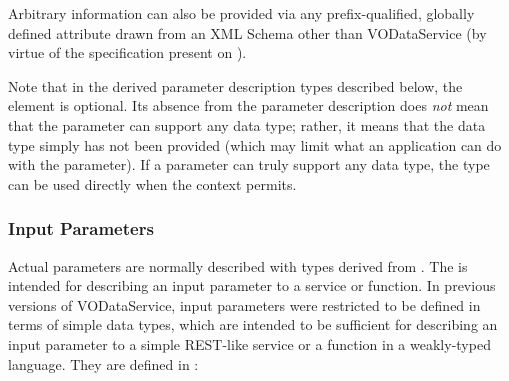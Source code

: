 \documentclass[11pt,a4paper]{ivoa}
\begin{document}
Arbitrary information can also be
provided via any prefix-qualified, globally defined attribute drawn
from an XML Schema other than VODataService (by virtue of the
 specification present
on ).





Note that in the derived parameter description types described below,
the  element is optional.  Its absence
from the parameter description does \emph{not} mean that the
parameter can support any data type; rather, it means that the data
type simply has not been provided (which may limit what an application
can do with the parameter).  If a parameter can truly support any data
type, the  type can be used directly when the
context permits.


\subsubsection{Input Parameters}
\label{sect:inputparam}


Actual parameters are normally described with types derived from
.  The  is intended
for describing an input parameter to a service or function.  In previous
versions of VODataService, input parameters were restricted to be defined
in terms of simple data types, which are intended to be
sufficient for describing an input parameter to a simple REST-like
service or a function in a weakly-typed language.  They are defined
in :
\end{document}
